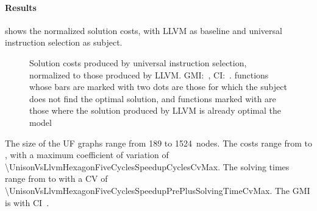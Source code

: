 \paragraph{Results}

 shows the normalized \gls{solution}
costs, with \gls{LLVM} as \gls{baseline} and \gls{universal instruction
  selection} as \gls{subject}.
%
\begin{figure}
  \centering%
  \maxsizebox{\textwidth}{!}{%
    \trimBarchartPlot{%
    }%
  }

  \caption[%
            Plot for evaluating universal instruction selection's impact on code
            quality in comparison with LLVM%
          ]%
          {%
            Solution costs produced by universal instruction selection,
            normalized to those produced by LLVM.
            GMI:~\printGMI{%
              \UnisonVsLlvmHexagonFiveCyclesSpeedupCyclesRegularSpeedupGmean%
            },
            CI:~\printGMICI{%
              \UnisonVsLlvmHexagonFiveCyclesSpeedupCyclesRegularSpeedupCiMin%
            }{%
              \UnisonVsLlvmHexagonFiveCyclesSpeedupCyclesRegularSpeedupCiMax%
            }.
            \Glspl{function} whose bars are marked with two dots are those for
            which the \gls{subject} does not find the optimal solution, and
            \glspl{function} marked with \barNormValueNoSolution{} are those
            where the solution produced by \gls{LLVM} is already optimal \wrt
            the model%
          }
\end{figure}
%
The size of the \glspl{UF graph} range from \num{189} to
\num{1524}~\glspl{node}.
%
The costs range from
\printCycles{\UnisonVsLlvmHexagonFiveCyclesSpeedupCyclesAvgMin} to
\printCycles{\UnisonVsLlvmHexagonFiveCyclesSpeedupCyclesAvgMax}, with a maximum
coefficient of variation of
\num{\UnisonVsLlvmHexagonFiveCyclesSpeedupCyclesCvMax}.
%
The solving times range from
\printSolvingTime{\UnisonVsLlvmHexagonFiveCyclesSpeedupPrePlusSolvingTimeAvgMin}
to
\printSolvingTime{\UnisonVsLlvmHexagonFiveCyclesSpeedupPrePlusSolvingTimeAvgMax}
with a \gls{CV} of
\num{\UnisonVsLlvmHexagonFiveCyclesSpeedupPrePlusSolvingTimeCvMax}.
%
The \gls{GMI} is \printGMI{%
  \UnisonVsLlvmHexagonFiveCyclesSpeedupCyclesRegularSpeedupGmean%
} with \gls{CI}~\printGMICI{%
  \UnisonVsLlvmHexagonFiveCyclesSpeedupCyclesRegularSpeedupCiMin%
}{%
  \UnisonVsLlvmHexagonFiveCyclesSpeedupCyclesRegularSpeedupCiMax%
}.

